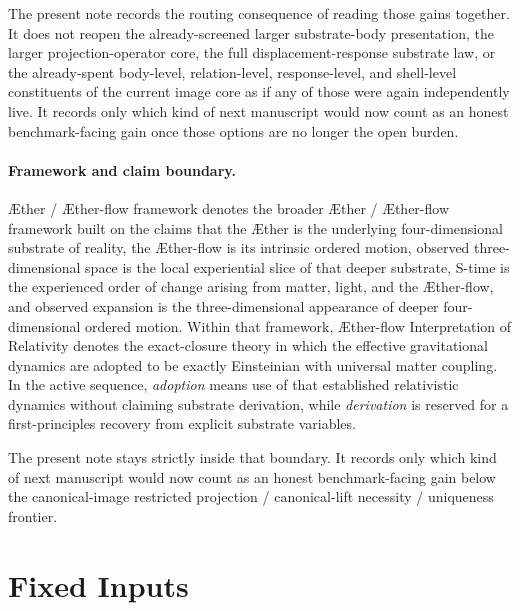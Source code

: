 \documentclass[11pt]{article}
\newcommand{\Aether}{\AE{}ther}
\newcommand{\Aflow}{\AE{}ther-flow}
\newcommand{\TheoryName}{\Aflow{} Interpretation of Relativity}
\newcommand{\TheoryProgram}{\Aether{} / \Aflow{} framework}
\begin{document}
The present note records the routing consequence of reading those gains together. It does not reopen the already-screened larger substrate-body presentation, the larger projection-operator core, the full displacement-response substrate law, or the already-spent body-level, relation-level, response-level, and shell-level constituents of the current image core as if any of those were again independently live. It records only which kind of next manuscript would now count as an honest benchmark-facing gain once those options are no longer the open burden.

\paragraph{Framework and claim boundary.}
\TheoryProgram{} denotes the broader \Aether{} / \Aflow{} framework built on the claims that the \Aether{} is the underlying four-dimensional substrate of reality, the \Aflow{} is its intrinsic ordered motion, observed three-dimensional space is the local experiential slice of that deeper substrate, S-time is the experienced order of change arising from matter, light, and the \Aflow{}, and observed expansion is the three-dimensional appearance of deeper four-dimensional ordered motion. Within that framework, \TheoryName{} denotes the exact-closure theory in which the effective gravitational dynamics are adopted to be exactly Einsteinian with universal matter coupling. In the active sequence, \emph{adoption} means use of that established relativistic dynamics without claiming substrate derivation, while \emph{derivation} is reserved for a first-principles recovery from explicit substrate variables.

The present note stays strictly inside that boundary. It records only which kind of next manuscript would now count as an honest benchmark-facing gain below the canonical-image restricted projection / canonical-lift necessity / uniqueness frontier.

\section{Fixed Inputs}
\end{document}

